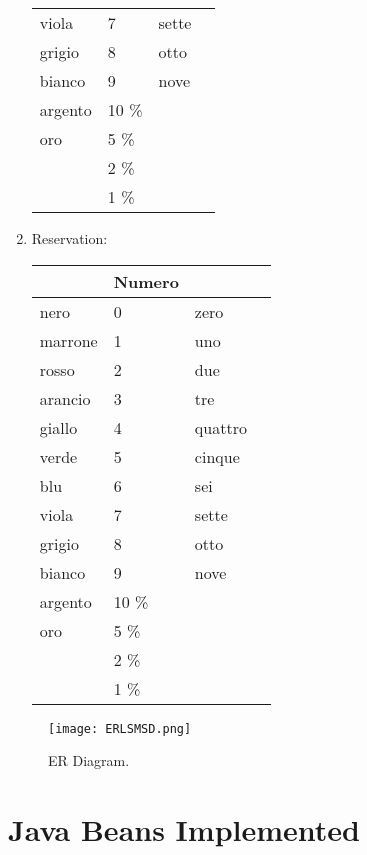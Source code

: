 \begin{enumerate}
\begin{tabular}{|l|l|l|l|}
viola           & 7     & sette         \\
grigio          & 8     & otto          \\
bianco          & 9     & nove          \\
argento         & 10 \% &               \\
oro             & 5 \%  &               \\
                & 2 \%  &               \\
                & 1 \%  &               \\
\hline
\end{tabular}
\item Reservation:
\begin{tabular}{|l|l|l|l|}
\hline
          & Numero        &       \\
\hline
nero            & 0     & zero          \\
marrone         & 1     & uno           \\
rosso           & 2     & due           \\
arancio         & 3     & tre           \\
giallo          & 4     & quattro       \\
verde           & 5     & cinque        \\
blu             & 6     & sei           \\
viola           & 7     & sette         \\
grigio          & 8     & otto          \\
bianco          & 9     & nove          \\
argento         & 10 \% &               \\
oro             & 5 \%  &               \\
                & 2 \%  &               \\
                & 1 \%  &               \\
\hline
\end{tabular}
\end{enumerate}
\begin{figure}
  \texttt{[image: ERLSMSD.png]}
  \caption{ER Diagram.}
  \label{figureER}
\end{figure}
\section {Java Beans Implemented}

\pagebreak